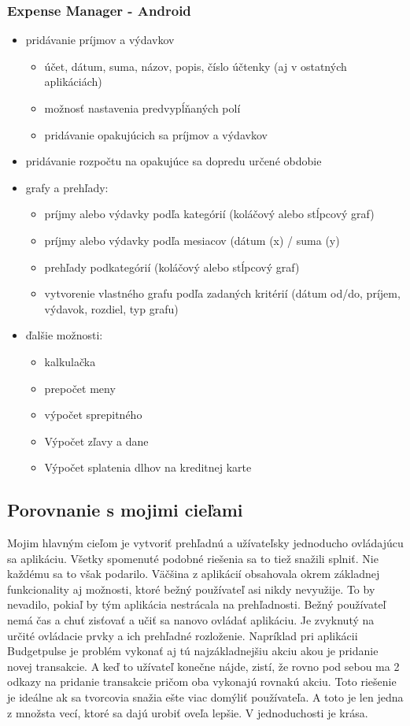 \documentclass[12pt,onesided]{book}
\begin{document}
\subsubsection{Expense Manager - Android \cite{ExpenseManager}\ }
\begin{itemize}
\item{pridávanie príjmov a výdavkov}
\begin{itemize}
\item{účet, dátum, suma, názov, popis, číslo účtenky (aj v ostatných aplikáciách)}
\item{možnosť nastavenia predvypĺňaných polí}
\item{pridávanie opakujúcich sa príjmov a výdavkov}
\end{itemize}
\item{pridávanie rozpočtu na opakujúce sa dopredu určené obdobie}
\item{grafy a prehľady:}
\begin{itemize}
\item{príjmy alebo výdavky podľa kategórií (koláčový alebo stĺpcový graf)}
\item{príjmy alebo výdavky podľa mesiacov (dátum (x) / suma (y)}
\item{prehľady podkategórií (koláčový alebo stĺpcový graf)}
\item{vytvorenie vlastného grafu podľa zadaných kritérií (dátum od/do, príjem, výdavok, rozdiel, typ grafu)}
\end{itemize}
\item{ďalšie možnosti:}
\begin{itemize}
\item{kalkulačka}
\item{prepočet meny}
\item{výpočet sprepitného}
\item{Výpočet zľavy a dane}
\item{Výpočet splatenia dlhov na kreditnej karte}
\end{itemize}
\end{itemize}

\subsection{Porovnanie s mojimi cieľami}
Mojim hlavným cieľom je vytvoriť prehľadnú a užívateľsky jednoducho ovládajúcu sa aplikáciu. Všetky spomenuté podobné riešenia sa to tiež snažili splniť. Nie každému sa to však podarilo. Väčšina z aplikácií obsahovala okrem základnej funkcionality aj možnosti, ktoré bežný používateľ asi nikdy nevyužije. To by nevadilo, pokiaľ by tým aplikácia nestrácala na prehľadnosti. Bežný používateľ nemá čas a chuť zisťovať a učiť sa nanovo ovládať aplikáciu. Je zvyknutý na určité ovládacie prvky a ich prehľadné rozloženie. Napríklad pri aplikácii Budgetpulse je problém vykonať aj tú najzákladnejšiu akciu akou je pridanie novej transakcie. A keď to užívateľ konečne nájde, zistí, že rovno pod sebou ma 2 odkazy na pridanie transakcie pričom oba vykonajú rovnakú akciu. Toto riešenie je ideálne ak sa tvorcovia snažia ešte viac domýliť používateľa. A toto je len jedna z množsta vecí, ktoré sa dajú urobiť oveľa lepšie. V jednoduchosti je krása.
\end{document}
